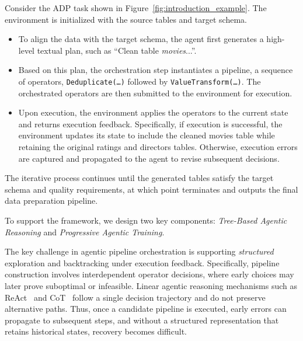 \begin{example}
    Consider the ADP task shown in Figure~\ref{fig:introduction_example}. The environment is initialized with the source tables and target schema. 
    \begin{itemize}[leftmargin=*]
    \item To align the data with the target schema, the agent first generates a high-level textual plan, such as ``Clean table \textit{movies}...''. 
    \item Based on this plan, the orchestration step instantiates a pipeline, \ie a sequence of operators, \eg \texttt{Deduplicate(\ldots)} followed by \texttt{ValueTransform(\ldots)}. The orchestrated operators are then submitted to the environment for execution. 
    \item Upon execution, the environment applies the operators to the current state and returns execution feedback. Specifically, if execution is successful, the environment updates its state to include the cleaned movies table while retaining the original ratings and directors tables. Otherwise, execution errors are captured and propagated to the agent to revise subsequent decisions.
    \end{itemize}
    The iterative process continues until the generated tables satisfy the target schema and quality requirements, at which point \sys terminates and outputs the final data preparation pipeline.
\end{example}

To support the framework, we design two key components: \emph{Tree-Based Agentic Reasoning} and \emph{Progressive Agentic Training}.

The key challenge in agentic pipeline orchestration is supporting \emph{structured} exploration and backtracking under execution feedback. Specifically, pipeline construction involves interdependent operator decisions, where early choices may later prove suboptimal or infeasible. Linear agentic reasoning mechanisms such as ReAct~\cite{aksitov2023rest} and CoT~\cite{wang2024chain} follow a single decision trajectory and do not preserve alternative paths. Thus, once a candidate pipeline is executed, early errors can propagate to subsequent steps, and without a structured representation that retains historical states, recovery becomes difficult.

